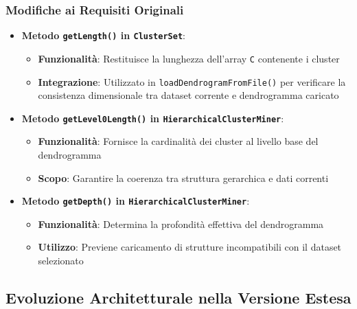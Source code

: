 \subsubsection{Modifiche ai Requisiti Originali}
\begin{itemize}
    \item \textbf{Metodo \texttt{getLength()} in \texttt{ClusterSet}}:
    \begin{itemize}
        \item \textbf{Funzionalità}: Restituisce la lunghezza dell'array \texttt{C} contenente i cluster
        \item \textbf{Integrazione}: Utilizzato in \texttt{loadDendrogramFromFile()} per verificare la consistenza dimensionale tra dataset corrente e dendrogramma caricato
    \end{itemize}

    \item \textbf{Metodo \texttt{getLevel0Length()} in \texttt{HierarchicalClusterMiner}}:
    \begin{itemize}
        \item \textbf{Funzionalità}: Fornisce la cardinalità dei cluster al livello base del dendrogramma
        \item \textbf{Scopo}: Garantire la coerenza tra struttura gerarchica e dati correnti
    \end{itemize}

    \item \textbf{Metodo \texttt{getDepth()} in \texttt{HierarchicalClusterMiner}}:
    \begin{itemize}
        \item \textbf{Funzionalità}: Determina la profondità effettiva del dendrogramma
        \item \textbf{Utilizzo}: Previene caricamento di strutture incompatibili con il dataset selezionato
    \end{itemize}
\end{itemize}

\subsection{Evoluzione Architetturale nella Versione Estesa}
